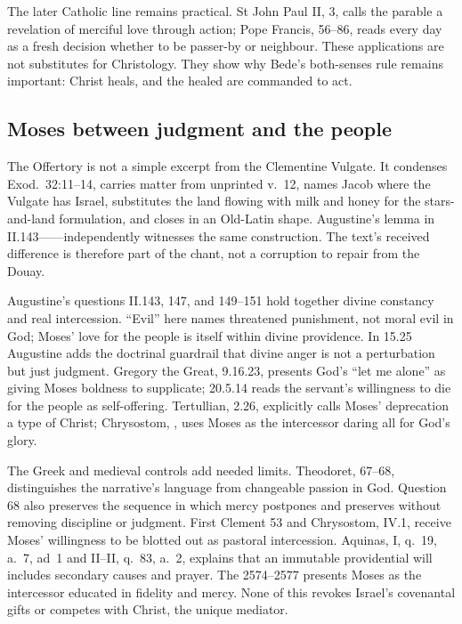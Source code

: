 The later Catholic line remains practical. St John Paul II,  3, calls the parable a revelation of merciful love through
action; Pope Francis,  56--86, reads every day as a fresh
decision whether to be passer-by or neighbour. These applications are not
substitutes for Christology. They show why Bede's both-senses rule remains
important: Christ heals, and the healed are commanded to act.

\elementguard
\subsection*{Moses between judgment and the people }

The Offertory is not a simple excerpt from the Clementine Vulgate. It condenses
Exod.~32:11--14, carries matter from unprinted v.~12, names Jacob where the
Vulgate has Israel, substitutes the land flowing with milk and honey for the
stars-and-land formulation, and closes in an Old-Latin shape. Augustine's
lemma in  II.143------independently witnesses the
same construction. The text's received difference is therefore part of the
chant, not a corruption to repair from the Douay.

Augustine's questions II.143, 147, and 149--151 hold together divine constancy and real
intercession. ``Evil'' here names threatened punishment, not moral evil in
God; Moses' love for the people is itself within divine providence. In
 15.25 Augustine adds the doctrinal guardrail that divine
anger is not a perturbation but just judgment. Gregory the Great,
 9.16.23, presents God's ``let me alone'' as giving Moses
boldness to supplicate;  20.5.14 reads the servant's willingness
to die for the people as self-offering. Tertullian,  2.26, explicitly
calls Moses' deprecation a type of Christ; Chrysostom, , uses Moses as the intercessor daring all for God's glory.

The Greek and medieval controls add needed limits. Theodoret,
 67--68, distinguishes the narrative's
language from changeable passion in God. Question 68 also preserves the
sequence in which mercy postpones and preserves without removing discipline
or judgment. First Clement 53 and Chrysostom,
 IV.1, receive Moses' willingness to be blotted out as
pastoral intercession. Aquinas,  I, q.~19, a.~7, ad~1 and II--II,
q.~83, a.~2, explains that an immutable providential will includes secondary
causes and prayer. The  2574--2577 presents Moses as the
intercessor educated in fidelity and mercy. None of this revokes Israel's
covenantal gifts or competes with Christ, the unique mediator.

